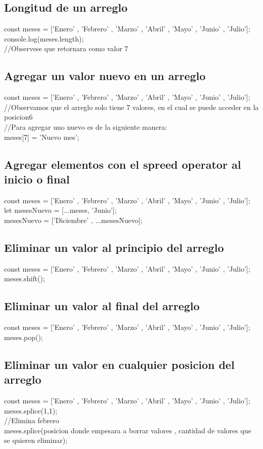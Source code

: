 \documentclass[10pt,a4paper]{article}
\begin{document}
\subsection{Longitud de un arreglo}  
const meses = ['Enero' , 'Febrero' , 'Marzo' , 'Abril' , 'Mayo' , 'Junio' , 'Julio']; \\
console.log(meses.length); \\
//Observese que retornara como valor 7\\
\subsection{Agregar un valor nuevo en un arreglo}
const meses = ['Enero' , 'Febrero' , 'Marzo' , 'Abril' , 'Mayo' , 'Junio' , 'Julio']; \\
//Observamos que el arreglo solo tiene 7 valores, en el cual se puede acceder en la posicion6 \\
//Para agregar uno nuevo es de la siguiente manera: \\
meses[7] = 'Nuevo mes'; \\
\subsection{Agregar elementos con el spreed operator al inicio o final} 
const meses = ['Enero' , 'Febrero' , 'Marzo' , 'Abril' , 'Mayo' , 'Junio' , 'Julio']; \\
let mesesNuevo = [...meses, 'Junio']; \\
mesesNuevo = ['Diciembre' , ...mesesNuevo]; \\
\subsection{Eliminar un valor al principio del arreglo} 
const meses = ['Enero' , 'Febrero' , 'Marzo' , 'Abril' , 'Mayo' , 'Junio' , 'Julio']; \\
meses.shift(); \\
\subsection{Eliminar un valor al final del arreglo} 
const meses = ['Enero' , 'Febrero' , 'Marzo' , 'Abril' , 'Mayo' , 'Junio' , 'Julio']; \\
meses.pop(); \\
\subsection{Eliminar un valor en cualquier posicion del arreglo} 
const meses = ['Enero' , 'Febrero' , 'Marzo' , 'Abril' , 'Mayo' , 'Junio' , 'Julio']; \\
meses.splice(1,1); \\
//Elimina febrero \\
meses.splice(posicion donde empesara a borrar valores , cantidad de valores que se quieren eliminar); \\
\end{document}
